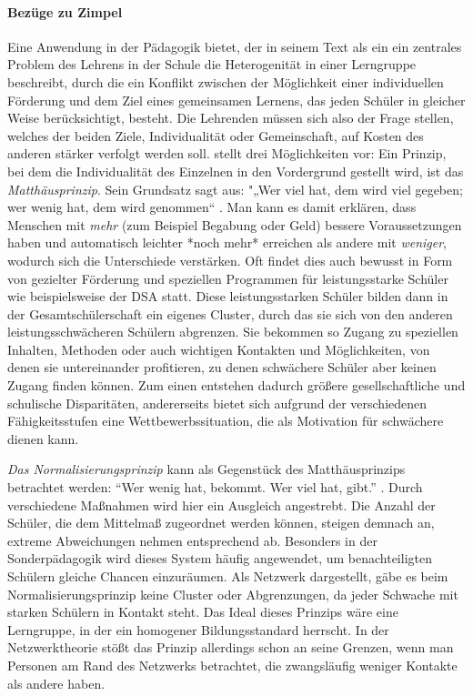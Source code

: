 \paragraph{Bezüge zu Zimpel}

Eine Anwendung in der Pädagogik bietet\citeauthor{Zimpel2012}, der in seinem Text als ein ein zentrales Problem des Lehrens in der Schule die Heterogenität in einer Lerngruppe beschreibt, durch die ein Konflikt zwischen der Möglichkeit einer individuellen Förderung und dem Ziel eines gemeinsamen Lernens, das jeden Schüler in gleicher Weise berücksichtigt, besteht.
Die Lehrenden müssen sich also der Frage stellen, welches der beiden Ziele, Individualität oder Gemeinschaft, auf Kosten des anderen stärker verfolgt werden soll.
\citeauthor{Zimpel2012} stellt drei Möglichkeiten vor:
Ein Prinzip, bei dem die Individualität des Einzelnen in den Vordergrund gestellt wird, ist das \emph{Matthäusprinzip}.
Sein Grundsatz sagt aus: "„Wer viel hat, dem wird viel gegeben; wer wenig hat, dem wird genommen“ \parencite[105]{Zimpel2012}.
Man kann es damit erklären, dass Menschen mit \emph{mehr} (zum Beispiel Begabung oder Geld) bessere Voraussetzungen haben und automatisch leichter *noch mehr* erreichen als andere mit  \emph{weniger}, wodurch sich die Unterschiede verstärken.
Oft findet dies auch bewusst in Form von gezielter Förderung und speziellen Programmen für leistungsstarke Schüler wie beispielsweise der DSA statt.
Diese leistungsstarken Schüler bilden dann in der Gesamtschülerschaft ein eigenes Cluster, durch das sie sich von den anderen leistungsschwächeren Schülern abgrenzen. Sie bekommen so Zugang zu speziellen Inhalten, Methoden oder auch wichtigen Kontakten und Möglichkeiten, von denen sie untereinander profitieren, zu denen schwächere Schüler aber keinen Zugang finden können.
Zum einen entstehen dadurch größere gesellschaftliche und schulische Disparitäten, andererseits bietet sich aufgrund der verschiedenen Fähigkeitsstufen eine Wettbewerbssituation, die als Motivation für schwächere dienen kann.

\emph{Das Normalisierungsprinzip} kann als Gegenstück des Matthäusprinzips betrachtet werden: ``Wer wenig hat, bekommt. Wer viel hat, gibt.'' \parencite[12]{Zimpel2012}.
Durch verschiedene Maßnahmen wird hier ein Ausgleich angestrebt.
Die Anzahl der Schüler, die dem Mittelmaß zugeordnet werden können, steigen demnach an, extreme Abweichungen nehmen entsprechend ab.
Besonders in der Sonderpädagogik wird dieses System häufig angewendet, um benachteiligten Schülern gleiche Chancen einzuräumen.
Als Netzwerk dargestellt, gäbe es beim Normalisierungsprinzip keine Cluster oder Abgrenzungen, da jeder Schwache mit starken Schülern in Kontakt steht.
Das Ideal dieses Prinzips wäre eine Lerngruppe, in der ein homogener Bildungsstandard herrscht.
In der Netzwerktheorie stößt das Prinzip allerdings schon an seine Grenzen, wenn man Personen am Rand des Netzwerks betrachtet, die zwangsläufig weniger Kontakte als andere haben.

